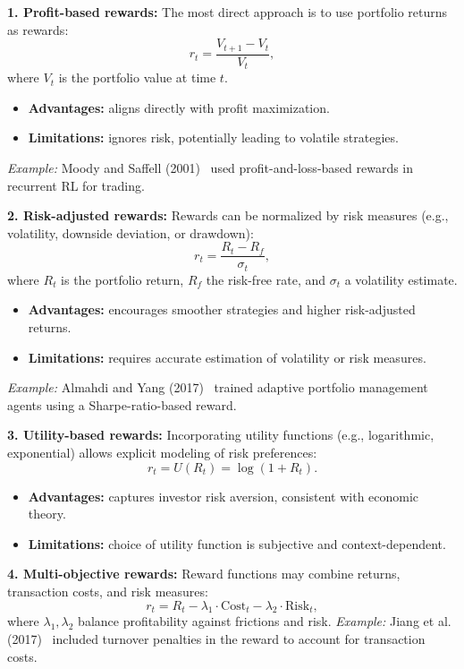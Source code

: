 \documentclass[12pt,a4paper]{report}
\begin{document}
\bigskip
\textbf{1. Profit-based rewards:}  
The most direct approach is to use portfolio returns as rewards:
\[
r_t = \frac{V_{t+1} - V_t}{V_t},
\]
where $V_t$ is the portfolio value at time $t$.  
\begin{itemize}
    \item \textbf{Advantages:} aligns directly with profit maximization.
    \item \textbf{Limitations:} ignores risk, potentially leading to volatile strategies.
\end{itemize}
\textit{Example:} Moody and Saffell (2001)~\cite{moody2001learning} used profit-and-loss-based rewards in recurrent RL for trading.

\bigskip
\textbf{2. Risk-adjusted rewards:}  
Rewards can be normalized by risk measures (e.g., volatility, downside deviation, or drawdown):
\[
r_t = \frac{R_t - R_f}{\sigma_t},
\]
where $R_t$ is the portfolio return, $R_f$ the risk-free rate, and $\sigma_t$ a volatility estimate.  
\begin{itemize}
    \item \textbf{Advantages:} encourages smoother strategies and higher risk-adjusted returns.
    \item \textbf{Limitations:} requires accurate estimation of volatility or risk measures.
\end{itemize}
\textit{Example:} Almahdi and Yang (2017)~\cite{almahdi2017adaptive} trained adaptive portfolio management agents using a Sharpe-ratio-based reward.

\bigskip
\textbf{3. Utility-based rewards:}  
Incorporating utility functions (e.g., logarithmic, exponential) allows explicit modeling of risk preferences:
\[
r_t = U(R_t) = \log(1 + R_t).
\]
\begin{itemize}
    \item \textbf{Advantages:} captures investor risk aversion, consistent with economic theory.
    \item \textbf{Limitations:} choice of utility function is subjective and context-dependent.
\end{itemize}

\bigskip
\textbf{4. Multi-objective rewards:}  
Reward functions may combine returns, transaction costs, and risk measures:
\[
r_t = R_t - \lambda_1 \cdot \text{Cost}_t - \lambda_2 \cdot \text{Risk}_t,
\]
where $\lambda_1, \lambda_2$ balance profitability against frictions and risk.  
\textit{Example:} Jiang et al. (2017)~\cite{jiang2017deeprl} included turnover penalties in the reward to account for transaction costs.
\end{document}
